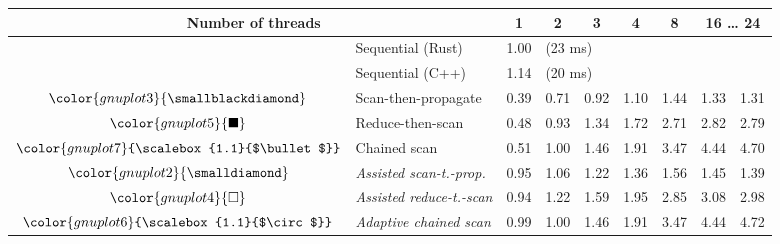 \begin{tabular}{clrrrrrrr}
\toprule
\multicolumn{2}{c}{\textbf{Number of threads}} & \multicolumn{1}{c}{\textbf{ 1 }} & \multicolumn{1}{c}{\textbf{ 2 }} & \multicolumn{1}{c}{\textbf{ 3 }} & \multicolumn{1}{c}{\textbf{ 4 }} & \multicolumn{1}{c}{\textbf{ 8 }} & \multicolumn{2}{c}{\textbf{ 16 } \dots \textbf{ 24 }} \\
\midrule
& Sequential (Rust) & \multicolumn{1}{r}{ 1.00 } & \multicolumn{ 6 }{l}{(23 ms)} \\
& Sequential (C++) & \multicolumn{1}{r}{ 1.14 } & \multicolumn{ 6 }{l}{(20 ms)} \\
\rowcolor{gnuplot3!10}$\color{gnuplot3}{\smallblackdiamond}$ & Scan-then-propagate & \cellcolor{gnuplot3!10} 0.39 & \cellcolor{gnuplot3!10} 0.71 & \cellcolor{gnuplot3!10} 0.92 & \cellcolor{gnuplot3!10} 1.10 & \cellcolor{gnuplot3!10} 1.44 & \cellcolor{gnuplot3!10} 1.33 & \cellcolor{gnuplot3!10} 1.31 \\
\rowcolor{gnuplot5!10}$\color{gnuplot5}{\blacksquare}$ & Reduce-then-scan & \cellcolor{gnuplot5!10} 0.48 & \cellcolor{gnuplot5!10} 0.93 & \cellcolor{gnuplot5!10} 1.34 & \cellcolor{gnuplot5!10} 1.72 & \cellcolor{gnuplot5!10} 2.71 & \cellcolor{gnuplot5!10} 2.82 & \cellcolor{gnuplot5!10} 2.79 \\
\rowcolor{gnuplot7!10}$\color{gnuplot7}{\scalebox{1.1}{$\bullet$}}$ & Chained scan & \cellcolor{gnuplot7!10} 0.51 & \cellcolor{gnuplot7!10} 1.00 & \cellcolor{gnuplot7!10} 1.46 & \cellcolor{gnuplot7!10} 1.91 & \cellcolor{gnuplot7!10} 3.47 & \cellcolor{gnuplot7!10} 4.44 & \cellcolor{gnuplot7!10} 4.70 \\
\rowcolor{gnuplot2!30}$\color{gnuplot2}{\smalldiamond}$ & \textit{Assisted scan-t.-prop.} & \cellcolor{gnuplot2!30} 0.95 & \cellcolor{gnuplot2!30} 1.06 & \cellcolor{gnuplot2!30} 1.22 & \cellcolor{gnuplot2!30} 1.36 & \cellcolor{gnuplot2!30} 1.56 & \cellcolor{gnuplot2!30} 1.45 & \cellcolor{gnuplot2!30} 1.39 \\
\rowcolor{gnuplot4!30}$\color{gnuplot4}{\square}$ & \textit{Assisted reduce-t.-scan} & \cellcolor{gnuplot4!30} 0.94 & \cellcolor{gnuplot4!30} 1.22 & \cellcolor{gnuplot4!30} 1.59 & \cellcolor{gnuplot4!30} 1.95 & \cellcolor{gnuplot4!30} 2.85 & \cellcolor{gnuplot4!30} 3.08 & \cellcolor{gnuplot4!30} 2.98 \\
\rowcolor{gnuplot6!30}$\color{gnuplot6}{\scalebox{1.1}{$\circ$}}$ & \textit{Adaptive chained scan} & \cellcolor{gnuplot6!30} 0.99 & \cellcolor{gnuplot6!30} 1.00 & \cellcolor{gnuplot6!30} 1.46 & \cellcolor{gnuplot6!30} 1.91 & \cellcolor{gnuplot6!30} 3.47 & \cellcolor{gnuplot6!30} 4.44 & \cellcolor{gnuplot6!30} 4.72 \\

\end{tabular}
